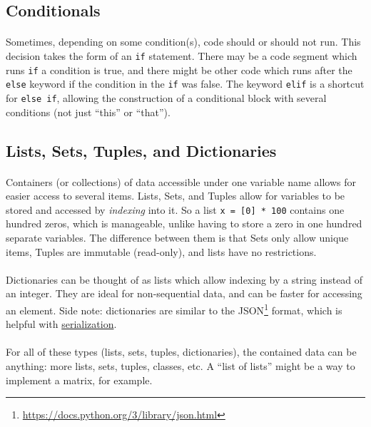 \documentclass[letter,10pt]{article}
\begin{document}
\subsection{Conditionals}
\paragraph{}Sometimes, depending on some condition(s), code should or should not run. This decision takes the form of an \verb|if| statement. There may be a code segment which runs \verb|if| a condition is true, and there might be other code which runs after the \verb|else| keyword if the condition in the \verb|if| was false. The keyword \verb|elif| is a shortcut for \verb|else if|, allowing the construction of a conditional block with several conditions (not just ``this'' or ``that'').

\subsection{Lists, Sets, Tuples, and Dictionaries}\label{sec:containers}
\paragraph{}Containers (or collections) of data accessible under one variable name allows for easier access to several items. Lists, Sets, and Tuples allow for variables to be stored and accessed by \textit{indexing} into it. So a list \verb|x = [0] * 100| contains one hundred zeros, which is manageable, unlike having to store a zero in one hundred separate variables. The difference between them is that Sets only allow unique items, Tuples are immutable (read-only), and lists have no restrictions.

\paragraph{}Dictionaries can be thought of as lists which allow indexing by a string instead of an integer. They are ideal for non-sequential data, and can be faster for accessing an element. Side note: dictionaries are similar to the JSON\footnote{\url{https://docs.python.org/3/library/json.html}} format, which is helpful with \hyperref[sec:fileio]{serialization}.

\paragraph{}For all of these types (lists, sets, tuples, dictionaries), the contained data can be anything: more lists, sets, tuples, classes, etc. A ``list of lists'' might be a way to implement a matrix, for example.
\end{document}
